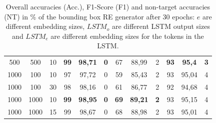 \begin{table}[ht]
\begin{tabular}{ccc|ccc|ccc|ccc}
        {500}  & {500}    & {10}     & \textbf{99}                         & \textbf{98,71}                      & \textbf{0}                               & {67}          & {88,99}        & {2}         & \textbf{93}   & \textbf{95,4}  & \textbf{3}  \\
        {1000} & {100}    & {10}     & {97}                                & {97,72}                             & {0}                                      & {59}          & {85,43}        & {2}         & {93}          & {95,04}        & {4}         \\
        {1000} & {100}    & {30}     & {98}                                & {98,16}                             & {0}                                      & {61}          & {86,77}        & {2}         & {92}          & {94,68}        & {4}         \\
        {1000} & {1000}   & {10}     & \textbf{99}                         & \textbf{98,95}                      & \textbf{0}                               & \textbf{69}   & \textbf{89,21} & \textbf{2}  & {93}          & {95,15}        & {4}         \\
        {1000} & {1000}   & {15}     & {99}                                & {98,67}                             & {0}                                      & {68}          & {88,98}        & {2}         & {93}          & {95,01}        & {4}         \\
        \bottomrule
    \end{tabular}
    \caption{Overall accuracies (Acc.), F1-Score (F1) and non-target accuracies (NT) in \% of the bounding box RE generator after 30 epochs: $e$ are different embedding sizes, $LSTM_o$ are different LSTM output sizes and $LSTM_e$ are different embedding sizes for the tokens in the LSTM.}
    \label{tab:results:bb-re-generator}
\end{table}

